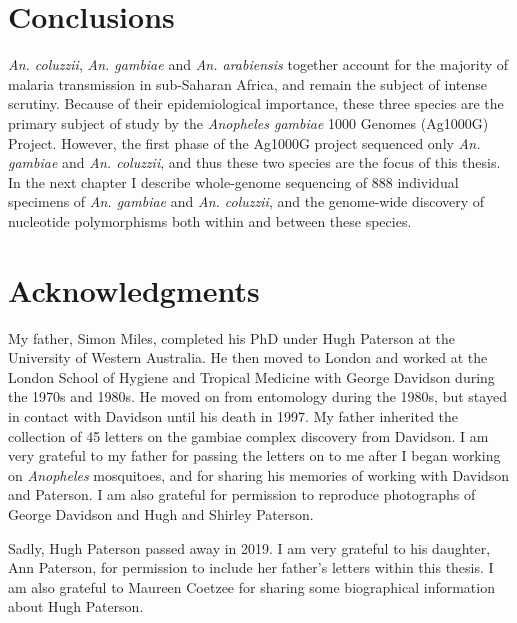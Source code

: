 \begin{refsection}
\section{Conclusions}\label{sec:conclusions}


%
\textit{An. coluzzii}, \textit{An. gambiae} and \textit{An. arabiensis} together account for the majority of malaria transmission in sub-Saharan Africa, and remain the subject of intense scrutiny.
%
Because of their epidemiological importance, these three species are the primary subject of study by the \textit{Anopheles gambiae} 1000 Genomes (Ag1000G) Project.
%
However, the first phase of the Ag1000G project sequenced only \textit{An. gambiae} and \textit{An. coluzzii}, and thus these two species are the focus of this thesis.
%
In the next chapter I describe whole-genome sequencing of 888 individual specimens of \textit{An. gambiae} and \textit{An. coluzzii}, and the genome-wide discovery of nucleotide polymorphisms both within and between these species. 


\section{Acknowledgments}\label{sec:acknowledgments}


My father, Simon Miles, completed his PhD under Hugh Paterson at the University of Western Australia. 
%
He then moved to London and worked at the London School of Hygiene and Tropical Medicine with George Davidson during the 1970s and 1980s. 
%
He moved on from entomology during the 1980s, but stayed in contact with Davidson until his death in 1997.
%
My father inherited the collection of 45 letters on the gambiae complex discovery from Davidson. 
%
I am very grateful to my father for passing the letters on to me after I began working on \textit{Anopheles} mosquitoes, and for sharing his memories of working with Davidson and Paterson.
%
I am also grateful for permission to reproduce photographs of George Davidson and Hugh and Shirley Paterson.


Sadly, Hugh Paterson passed away in 2019.
%
I am very grateful to his daughter, Ann Paterson, for permission to include her father's letters within this thesis.
%
I am also grateful to Maureen Coetzee for sharing some biographical information about Hugh Paterson.
%


\printbibliography[
heading=subbibintoc,
title={References}
]


\end{refsection}
